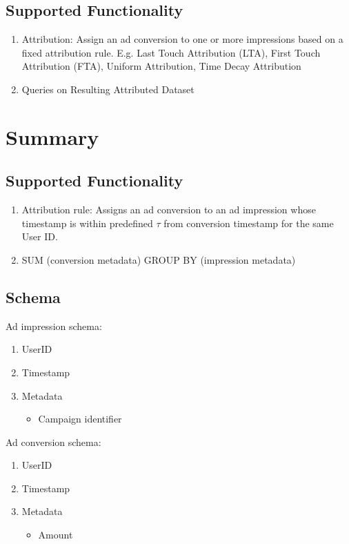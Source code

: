 \subsection{Supported Functionality}
\begin{enumerate}
    \item Attribution: Assign an ad conversion to one or more impressions based on a fixed attribution rule. E.g. Last Touch Attribution (LTA), First Touch Attribution (FTA), Uniform Attribution, Time Decay Attribution
    \item Queries on Resulting Attributed Dataset 
\end{enumerate}

\section{Summary}


\subsection{Supported Functionality}
\begin{enumerate}
    \item Attribution rule: Assigns an ad conversion to an ad impression whose timestamp is within predefined $\tau$ from conversion timestamp for the same User ID. 
    \item SUM (conversion metadata) GROUP BY (impression metadata)
\end{enumerate}

\subsection{Schema}
Ad impression schema:
\begin{enumerate}
    \item UserID
    \item Timestamp
    \item Metadata 
    \begin{itemize}
        \item Campaign identifier
    \end{itemize}
\end{enumerate}

Ad conversion schema:
\begin{enumerate}
    \item UserID
    \item Timestamp
    \item Metadata 
    \begin{itemize}
        \item Amount
    \end{itemize}
\end{enumerate}


